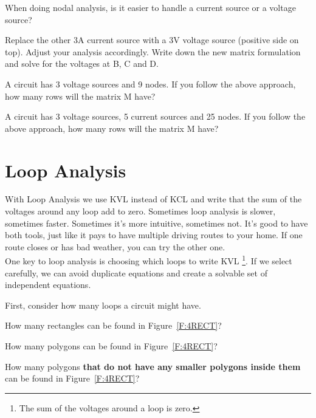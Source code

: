 \begin{alevel}
When doing nodal analysis, is it easier to handle a current source or a voltage source?
\end{alevel}

\begin{clevel}
Replace the other 3A current source with a 3V voltage source (positive side on top). Adjust your analysis accordingly. Write down the new matrix formulation and solve for the voltages at B, C and D.
\end{clevel}

\begin{clevel}
A circuit has 3 voltage sources and 9 nodes. If you follow the above approach, how many rows will the matrix M have?
\end{clevel}

\begin{clevel}
A circuit has 3 voltage sources, 5 current sources and 25 nodes. If you follow the above approach, how many rows will the matrix M have?
\end{clevel}


\section{Loop Analysis}
With Loop Analysis we use KVL instead of KCL and write that the sum of the voltages around any loop add to zero. Sometimes loop analysis is slower, sometimes faster. Sometimes it's more intuitive, sometimes not. It's good to have both tools, just like it pays to have multiple driving routes to your home. If one route closes or has bad weather, you can try the other one.\\

One key to loop analysis is choosing which loops to write KVL \footnote{The sum of the voltages around a loop is zero.}. If we select carefully, we can avoid duplicate equations and create a solvable set of independent equations.
\par
First, consider how many loops a circuit might have.
\begin{alevel}
How many rectangles can be found in Figure~\ref{F:4RECT}?
\end{alevel}

\begin{blevel}
How many polygons can be found in Figure~\ref{F:4RECT}?
\end{blevel}

\begin{clevel}
How many polygons \textbf{that do not have any smaller polygons inside them} can be found in Figure~\ref{F:4RECT}?
\end{clevel}

